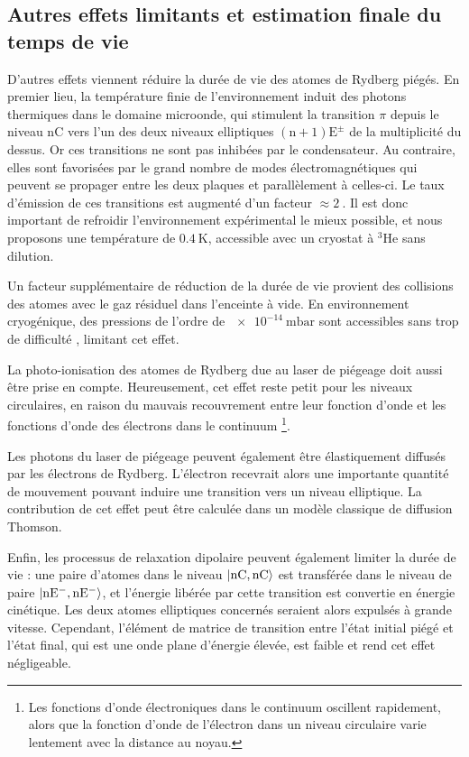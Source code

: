 \subsection{Autres effets limitants et estimation finale du temps de vie}
D'autres effets viennent réduire la durée de vie des atomes de Rydberg piégés. %
%
En premier lieu, la température finie de l'environnement induit des photons thermiques dans le domaine microonde, qui stimulent la transition $\pi$ depuis le niveau $\mathrm{nC}$ vers l'un des deux niveaux elliptiques $\mathrm{(n+1)E^\pm}$ de la multiplicité du dessus.
Or ces transitions ne sont pas inhibées par le condensateur.
Au contraire, elles sont favorisées par le grand nombre de modes électromagnétiques qui peuvent se propager entre les deux plaques et parallèlement à celles-ci.
Le taux d'émission de ces transitions est augmenté d'un facteur $\approx \SI{2}{}$.
Il est donc important de refroidir l'environnement expérimental le mieux possible, et nous proposons une température de $\SI{0.4}{\K}$, accessible avec un cryostat à $^3$He sans dilution.

Un facteur supplémentaire de réduction de la durée de vie provient des collisions des atomes avec le gaz résiduel dans l'enceinte à vide.
En environnement cryogénique, des pressions de l'ordre de $\SI{e-14}{\milli\bar}$ sont accessibles sans trop de difficulté \cite{MX_GABRIELSEANTIPROTON90,MX_WERTHCRYOION98}, limitant cet effet.

La photo-ionisation des atomes de Rydberg due au laser de piégeage doit aussi être prise en compte.
Heureusement, cet effet reste petit pour les niveaux circulaires, en raison du mauvais recouvrement entre leur fonction d'onde et les fonctions d'onde des électrons dans le continuum
\footnote{Les fonctions d'onde électroniques dans le continuum oscillent rapidement, alors que la fonction d'onde de l'électron dans un niveau circulaire varie lentement avec la distance au noyau.}.

Les photons du laser de piégeage peuvent également être élastiquement diffusés par les électrons de Rydberg. L'électron recevrait alors une importante quantité de mouvement pouvant induire une transition vers un niveau elliptique.
La contribution de cet effet peut être calculée dans un modèle classique de diffusion Thomson.

Enfin, les processus de relaxation dipolaire peuvent également limiter la durée de vie : une paire d'atomes dans le niveau $\ket{\mathrm{nC,nC}}$ est transférée dans le niveau de paire $\ket{\mathrm{nE^- , nE^-}}$, et l'énergie libérée par cette transition est convertie en énergie cinétique. Les deux atomes elliptiques concernés seraient alors expulsés à grande vitesse.
Cependant, l'élément de matrice de transition entre l'état initial piégé et l'état final, qui est une onde plane d'énergie élevée, est faible et rend cet effet négligeable.


